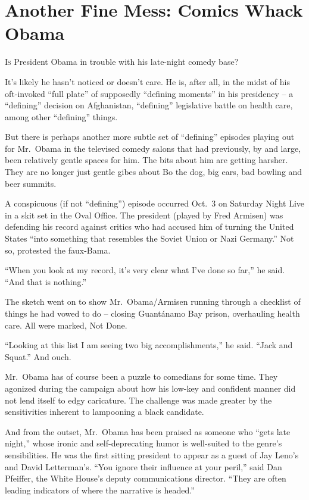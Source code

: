 ﻿\documentclass[12pt]{article}
\begin{document}
\section{Another Fine Mess: Comics Whack Obama}

\lettrine{I}{s} President Obama in trouble with his late-night comedy base?

It's likely he hasn't noticed or doesn't care. He is, after all, in the midst of his oft-invoked
``full plate'' of supposedly ``defining moments'' in his presidency -- a ``defining'' decision on
Afghanistan, ``defining'' legislative battle on health care, among other ``defining'' things.

But there is perhaps another more subtle set of ``defining'' episodes playing out for Mr.~Obama in
the televised comedy salons that had previously, by and large, been relatively gentle spaces for
him. The bits about him are getting harsher. They are no longer just gentle gibes\cite{gibe} about
Bo the dog, big ears, bad bowling and beer summits.

A conspicuous\cite{conspicuous} (if not ``defining'') episode occurred Oct.~3 on Saturday Night Live
in a skit\cite{skit} set in the Oval Office. The president (played by Fred Armisen) was defending
his record against critics who had accused him of turning the United States ``into something that
resembles the Soviet Union or Nazi Germany.'' Not so, protested the faux-Bama.

``When you look at my record, it's very clear what I've done so far,'' he said. ``And that is
nothing.''

The sketch went on to show Mr.~Obama/Armisen running through a checklist of things he had vowed to
do -- closing Guant\'anamo Bay prison, overhauling health care. All were marked, Not Done.

``Looking at this list I am seeing two big accomplishments,'' he said. ``Jack and Squat.'' And ouch.

Mr.~Obama has of course been a puzzle to comedians for some time. They agonized during the campaign
about how his low-key and confident manner did not lend itself to edgy caricature. The challenge was
made greater by the sensitivities inherent to lampooning a black candidate.

And from the outset, Mr.~Obama has been praised as someone who ``gets late night,'' whose ironic and
self-deprecating humor is well-suited to the genre's sensibilities. He was the first sitting
president to appear as a guest of Jay Leno's and David Letterman's. ``You ignore their influence at
your peril,'' said Dan Pfeiffer, the White House's deputy communications director. ``They are often
leading indicators of where the narrative is headed.''
\end{document}
